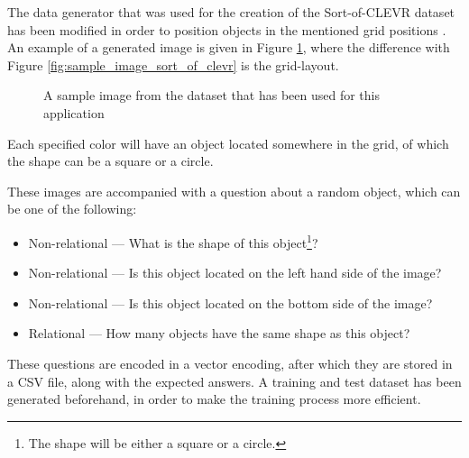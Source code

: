 \documentclass[english]{sobraep}
\begin{document}
The data generator that was used for the creation of the Sort-of-CLEVR dataset has been modified in order to position objects in the mentioned grid positions \cite{sort_of_clevr_dataset}. An example of a generated image is given in Figure \ref{fig:sample_image_own_dataset}, where the difference with Figure \ref{fig:sample_image_sort_of_clevr} is the grid-layout.

\begin{figure}[htp]
    \begin{center}
    \captionsetup{justification=centering}
    \caption{A sample image from the dataset that has been used for this application}
    \label{fig:sample_image_own_dataset}
    \end{center}
\end{figure}

Each specified color will have an object located somewhere in the grid, of which the shape can be a square or a circle.

These images are accompanied with a question about a random object, which can be one of the following:
\begin{itemize}
    \item Non-relational --- What is the shape of this object\footnote{The shape will be either a square or a circle.}?
    \item Non-relational --- Is this object located on the left hand side of the image?
    \item Non-relational --- Is this object located on the bottom side of the image?
    \item Relational --- How many objects have the same shape as this object?
\end{itemize}

These questions are encoded in a vector encoding, after which they are stored in a CSV file, along with the expected answers. A training and test dataset has been generated beforehand, in order to make the training process more efficient. 
\end{document}
